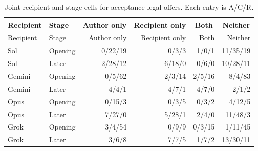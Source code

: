 \begin{longtable}{@{}llrrrr@{}}
\caption{Joint recipient and stage cells for acceptance-legal offers. Each entry is A/C/R.}\label{tab:joint}\\
\toprule Recipient & Stage & \multicolumn{1}{c}{Author only} & \multicolumn{1}{c}{Recipient only} & \multicolumn{1}{c}{Both} & \multicolumn{1}{c}{Neither}\\\midrule\endfirsthead
\toprule Recipient & Stage & Author only & Recipient only & Both & Neither\\\midrule\endhead
\bottomrule\endfoot
Sol & Opening & 0/22/19 & 0/3/3 & 1/0/1 & 11/35/19 \\
Sol & Later & 2/28/12 & 6/18/0 & 0/6/0 & 10/28/11 \\
Gemini & Opening & 0/5/62 & 2/3/14 & 2/5/16 & 8/4/83 \\
Gemini & Later & 4/4/1 & 4/7/1 & 4/7/0 & 2/1/2 \\
Opus & Opening & 0/15/3 & 0/3/5 & 0/3/2 & 4/12/5 \\
Opus & Later & 7/27/0 & 5/28/1 & 2/4/0 & 11/48/3 \\
Grok & Opening & 3/4/54 & 0/9/9 & 0/3/15 & 1/11/45 \\
Grok & Later & 3/6/8 & 7/7/5 & 1/7/2 & 13/30/11 \\
\end{longtable}
